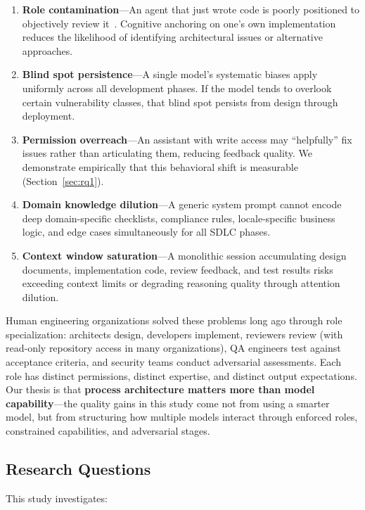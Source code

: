 \documentclass[11pt,a4paper]{article}
\begin{document}
\begin{enumerate}
    \item \textbf{Role contamination}---An agent that just wrote code is poorly positioned to objectively review it~\cite{beller2014}. Cognitive anchoring on one's own implementation reduces the likelihood of identifying architectural issues or alternative approaches.
    \item \textbf{Blind spot persistence}---A single model's systematic biases apply uniformly across all development phases. If the model tends to overlook certain vulnerability classes, that blind spot persists from design through deployment.
    \item \textbf{Permission overreach}---An assistant with write access may ``helpfully'' fix issues rather than articulating them, reducing feedback quality. We demonstrate empirically that this behavioral shift is measurable (Section~\ref{sec:rq1}).
    \item \textbf{Domain knowledge dilution}---A generic system prompt cannot encode deep domain-specific checklists, compliance rules, locale-specific business logic, and edge cases simultaneously for all SDLC phases.
    \item \textbf{Context window saturation}---A monolithic session accumulating design documents, implementation code, review feedback, and test results risks exceeding context limits or degrading reasoning quality through attention dilution.
\end{enumerate}

Human engineering organizations solved these problems long ago through role specialization: architects design, developers implement, reviewers review (with read-only repository access in many organizations), QA engineers test against acceptance criteria, and security teams conduct adversarial assessments. Each role has distinct permissions, distinct expertise, and distinct output expectations. Our thesis is that \textbf{process architecture matters more than model capability}---the quality gains in this study come not from using a smarter model, but from structuring how multiple models interact through enforced roles, constrained capabilities, and adversarial stages.

\subsection{Research Questions}

This study investigates:
\end{document}
